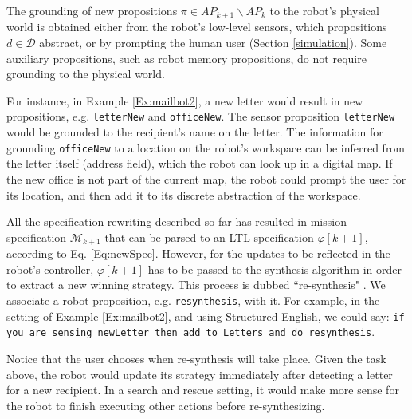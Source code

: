 \begin{myAssumption}
	The grounding \cite{Grounding2013} of new propositions 
$\pi \in AP_{k+1} \backslash AP_k$ to the robot's physical world is obtained either from the robot's low-level sensors, which propositions $d \in \mathcal{D}$ abstract, or by prompting the human user (Section \ref{simulation}).
Some auxiliary propositions, such as robot memory propositions, do not require grounding to the physical world.
\end{myAssumption}

For instance, in Example \ref{Ex:mailbot2}, a new letter would result in new propositions, e.g. \texttt{letterNew} and \texttt{officeNew}. The sensor proposition \texttt{letterNew} would be grounded to the recipient's name on the letter. The information for grounding \texttt{officeNew} to a location on the robot's workspace can be inferred from the letter itself (address field), which the robot can look up in a digital map. If the new office is not part of the current map, the robot could prompt the user for its location, and then add it to its discrete abstraction of the workspace.

All the specification rewriting described so far has resulted in mission specification $\mathcal{M}_{k+1}$ that can be parsed to an LTL specification $\varphi [k+1]$, according to Eq. \eqref{Eq:newSpec}. However, for the updates to be reflected in the robot's controller, $\varphi [k+1]$ has to be passed to the synthesis algorithm in order to extract a new winning strategy. This process is dubbed ``re-synthesis" \cite{BingxinRSS2012}. We associate a robot proposition, e.g. \texttt{resynthesis}, with it. For example, in the setting of Example \ref{Ex:mailbot2}, and using Structured English, we could say:
\texttt{if you are sensing newLetter then add to Letters and do resynthesis}. 

Notice that the user chooses when re-synthesis will take place. Given the task above, the robot would update its strategy immediately after detecting a letter for a new recipient. In a search and rescue setting, it would make more sense for the robot to finish executing other actions before re-synthesizing.

